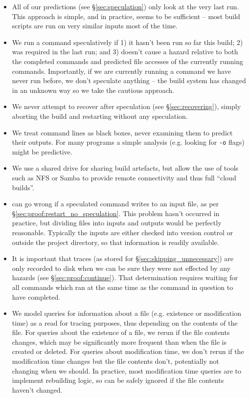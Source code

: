 \begin{itemize}
\item All of our predictions (see \S\ref{sec:speculation}) only look at the very last run. This approach is simple, and in practice, seems to be sufficient -- most build scripts are run on very similar inputs most of the time.
\item We run a command speculatively if 1) it hasn't been run so far this build; 2) was required in the last run; and 3) doesn't cause a hazard relative to both the completed commands and predicted file accesses of the currently running commands. Importantly, if we are currently running a command we have never run before, we don't speculate anything -- the build system has changed in an unknown way so we take the cautious approach.
\item We never attempt to recover after speculation (see \S\ref{sec:recovering}), simply aborting the build and restarting without any speculation.
\item We treat command lines as black boxes, never examining them to predict their outputs. For many programs a simple analysis (e.g. looking for \texttt{-o} flags) might be predictive.
\item We use a shared drive for sharing build artefacts, but allow the use of tools such as NFS or Samba to provide remote connectivity and thus full ``cloud builds''.
\item \Rattle can go wrong if a speculated command writes to an input file, as per \S\ref{sec:proof:restart_no_speculation}. This problem hasn't occurred in practice, but dividing files into inputs and outputs would be perfectly reasonable. Typically the inputs are either checked into version control or outside the project directory, so that information is readily available.
\item It is important that traces (as stored for \S\ref{sec:skipping_unnecessary}) are only recorded to disk when we can be sure they were not effected by any hazards (see \S\ref{sec:proof:continue}). That determination requires waiting for all commands which ran at the same time as the command in question to have completed.
\item We model queries for information about a file (e.g. existence or modification time) as a read for tracing purposes, thus depending on the contents of the file. For queries about the existence of a file, we rerun if the file contents changes, which may be significantly more frequent than when the file is created or deleted. For queries about modification time, we don't rerun if the modification time changes but the file contents don't, potentially not changing when we should. In practice, most modification time queries are to implement rebuilding logic, so can be safely ignored if the file contents haven't changed.

\end{itemize}

